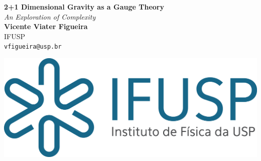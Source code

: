 \documentclass[a0,portrait]{a0poster}
\begin{document}


\begin{minipage}[b]{0.71\linewidth}
\veryHuge \color{NavyBlue} \textbf{2+1 Dimensional Gravity as a Gauge Theory} \color{Black}\\ %
\Huge\textit{An Exploration of Complexity}\\[2cm] %
\huge \textbf{Vicente Viater Figueira}\\[0.5cm] %
\huge IFUSP\\[0.4cm] %
\Large \texttt{vfigueira@usp.br}\\
\end{minipage}
%
\begin{minipage}[b]{0.29\linewidth}
\includegraphics[width=20cm]{logohorizontalifusp.png}\\
\vspace{3cm}
\end{minipage}

\vspace{1cm} %

\end{document}
